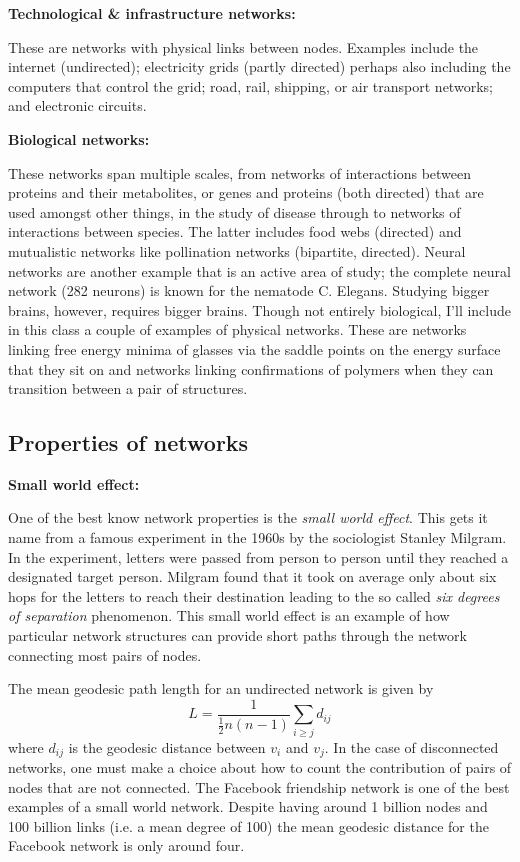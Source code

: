 {\bf Technological \& infrastructure networks:} 

These are networks with physical links between nodes. Examples include the internet (undirected); electricity grids (partly directed) perhaps also including the computers that control the grid; road, rail, shipping, or air transport networks; and electronic circuits. 


{\bf Biological networks:} 

These networks span multiple scales, from networks of interactions between proteins and their metabolites, or genes and proteins (both directed) that are used amongst other things, in the study of disease through to networks of interactions between species. The latter includes food webs (directed) and mutualistic networks like pollination networks (bipartite, directed). Neural networks are another example that is an active area of study; the complete neural network (282 neurons) is known for the nematode C. Elegans. Studying bigger brains, however, requires bigger brains. Though not entirely biological, I'll include in this class a couple of examples of physical networks. These are networks linking free energy minima of glasses via the saddle points on the energy surface that they sit on and networks linking confirmations of polymers when they can transition between a pair of structures. 


\subsection{Properties of networks}

{\bf Small world effect:}

One of the best know network properties is the \emph{small world effect}. This gets it name from a famous experiment in the 1960s by the sociologist Stanley Milgram. In the experiment, letters were passed from person to person until they reached a designated target person. Milgram found that it took on average only about six hops for the letters to reach their destination leading to the so called \emph{six degrees of separation} phenomenon. This small world effect is an example of how particular network structures can provide short paths through the network connecting most pairs of nodes. 

The mean geodesic path length for an undirected network is given by
$$
	L =\frac{1}{\frac12 n(n-1)}\sum_{i\geq j} d_{ij}
$$
where $d_{ij}$ is the geodesic distance between $v_i$ and $v_j$. In the case of disconnected networks, one must make a choice about how to count the contribution of pairs of nodes that are not connected. The Facebook friendship network is one of the best examples of a small world network. Despite having around 1 billion nodes and 100 billion links (i.e. a mean degree of 100) the mean geodesic distance for the Facebook network is only around four.

